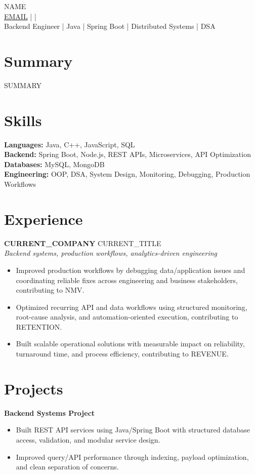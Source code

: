 \documentclass[10pt]{article}
\begin{document}
\begin{center}
{\Large {{NAME}}}\\
\href{mailto:{{EMAIL}}}{{{EMAIL}}} \quad |  \quad | \\
Backend Engineer | Java | Spring Boot | Distributed Systems | DSA
\end{center}

\section*{Summary}
{{SUMMARY}}

\section*{Skills}
\textbf{Languages:} Java, C++, JavaScript, SQL\\
\textbf{Backend:} Spring Boot, Node.js, REST APIs, Microservices, API Optimization\\
\textbf{Databases:} MySQL, MongoDB\\
\textbf{Engineering:} OOP, DSA, System Design, Monitoring, Debugging, Production Workflows

\section*{Experience}
\textbf{{{CURRENT_COMPANY}}} \hfill {{CURRENT_TITLE}}\\
\textit{Backend systems, production workflows, analytics-driven engineering}\\
\begin{itemize}
\item Improved production workflows by debugging data/application issues and coordinating reliable fixes across engineering and business stakeholders, contributing to {{NMV}}.
\item Optimized recurring API and data workflows using structured monitoring, root-cause analysis, and automation-oriented execution, contributing to {{RETENTION}}.
\item Built scalable operational solutions with measurable impact on reliability, turnaround time, and process efficiency, contributing to {{REVENUE}}.
\end{itemize}

\section*{Projects}
\textbf{Backend Systems Project}\\
\begin{itemize}
\item Built REST API services using Java/Spring Boot with structured database access, validation, and modular service design.
\item Improved query/API performance through indexing, payload optimization, and clean separation of concerns.
\end{itemize}
\end{document}
